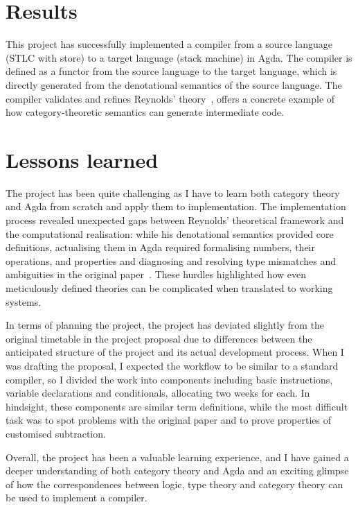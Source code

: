 \documentclass[12pt,a4paper]{report}
\theoremstyle{definition}
\begin{document}
    \section{Results}
    This project has successfully implemented a compiler from a source language (STLC with store) to a target language (stack machine) in Agda. The compiler is defined as a functor from the source language to the target language, which is directly generated from the denotational semantics of the source language. The compiler validates and refines Reynolds' theory~\autocite{Reynolds}, offers a concrete example of how category-theoretic semantics can generate intermediate code.

    \section{Lessons learned}
    The project has been quite challenging as I have to learn both category theory and Agda from scratch and apply them to implementation. The implementation process revealed unexpected gaps between Reynolds' theoretical framework and the computational realisation: while his denotational semantics provided core definitions, actualising them in Agda required formalising numbers, their operations, and properties and diagnosing and resolving type mismatches and ambiguities in the original paper~\autocite{Reynolds}. These hurdles highlighted how even meticulously defined theories can be complicated when translated to working systems.


    In terms of planning the project, the project has deviated slightly from the original timetable in the project proposal due to differences
    between the anticipated structure of the project and its actual development process. When I was drafting the proposal, I expected the workflow to be similar to a standard compiler, so I divided the work into components including basic instructions, variable declarations and conditionals, allocating two weeks for each. In hindsight, these components are similar term definitions, while the most difficult task was to spot problems with the original paper and to prove properties of customised subtraction. 

    Overall, the project has been a valuable learning experience, and I have gained a deeper understanding of both category theory and Agda and an exciting glimpse of how the correspondences between logic, type theory and category theory can be used to implement a compiler.
\end{document}
